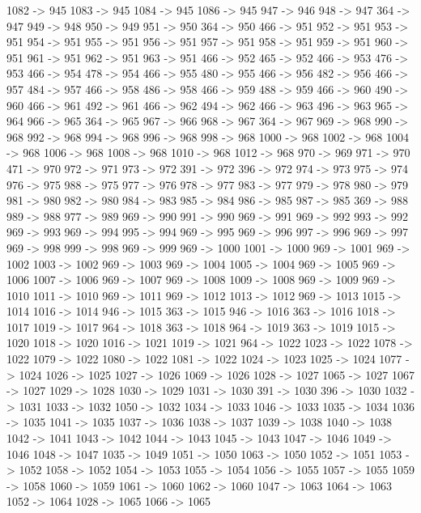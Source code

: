 {	1082 -> 945
	1083 -> 945
	1084 -> 945
	1086 -> 945
	947 -> 946
	948 -> 947
	364 -> 947
	949 -> 948
	950 -> 949
	951 -> 950
	364 -> 950
	466 -> 951
	952 -> 951
	953 -> 951
	954 -> 951
	955 -> 951
	956 -> 951
	957 -> 951
	958 -> 951
	959 -> 951
	960 -> 951
	961 -> 951
	962 -> 951
	963 -> 951
	466 -> 952
	465 -> 952
	466 -> 953
	476 -> 953
	466 -> 954
	478 -> 954
	466 -> 955
	480 -> 955
	466 -> 956
	482 -> 956
	466 -> 957
	484 -> 957
	466 -> 958
	486 -> 958
	466 -> 959
	488 -> 959
	466 -> 960
	490 -> 960
	466 -> 961
	492 -> 961
	466 -> 962
	494 -> 962
	466 -> 963
	496 -> 963
	965 -> 964
	966 -> 965
	364 -> 965
	967 -> 966
	968 -> 967
	364 -> 967
	969 -> 968
	990 -> 968
	992 -> 968
	994 -> 968
	996 -> 968
	998 -> 968
	1000 -> 968
	1002 -> 968
	1004 -> 968
	1006 -> 968
	1008 -> 968
	1010 -> 968
	1012 -> 968
	970 -> 969
	971 -> 970
	471 -> 970
	972 -> 971
	973 -> 972
	391 -> 972
	396 -> 972
	974 -> 973
	975 -> 974
	976 -> 975
	988 -> 975
	977 -> 976
	978 -> 977
	983 -> 977
	979 -> 978
	980 -> 979
	981 -> 980
	982 -> 980
	984 -> 983
	985 -> 984
	986 -> 985
	987 -> 985
	369 -> 988
	989 -> 988
	977 -> 989
	969 -> 990
	991 -> 990
	969 -> 991
	969 -> 992
	993 -> 992
	969 -> 993
	969 -> 994
	995 -> 994
	969 -> 995
	969 -> 996
	997 -> 996
	969 -> 997
	969 -> 998
	999 -> 998
	969 -> 999
	969 -> 1000
	1001 -> 1000
	969 -> 1001
	969 -> 1002
	1003 -> 1002
	969 -> 1003
	969 -> 1004
	1005 -> 1004
	969 -> 1005
	969 -> 1006
	1007 -> 1006
	969 -> 1007
	969 -> 1008
	1009 -> 1008
	969 -> 1009
	969 -> 1010
	1011 -> 1010
	969 -> 1011
	969 -> 1012
	1013 -> 1012
	969 -> 1013
	1015 -> 1014
	1016 -> 1014
	946 -> 1015
	363 -> 1015
	946 -> 1016
	363 -> 1016
	1018 -> 1017
	1019 -> 1017
	964 -> 1018
	363 -> 1018
	964 -> 1019
	363 -> 1019
	1015 -> 1020
	1018 -> 1020
	1016 -> 1021
	1019 -> 1021
	964 -> 1022
	1023 -> 1022
	1078 -> 1022
	1079 -> 1022
	1080 -> 1022
	1081 -> 1022
	1024 -> 1023
	1025 -> 1024
	1077 -> 1024
	1026 -> 1025
	1027 -> 1026
	1069 -> 1026
	1028 -> 1027
	1065 -> 1027
	1067 -> 1027
	1029 -> 1028
	1030 -> 1029
	1031 -> 1030
	391 -> 1030
	396 -> 1030
	1032 -> 1031
	1033 -> 1032
	1050 -> 1032
	1034 -> 1033
	1046 -> 1033
	1035 -> 1034
	1036 -> 1035
	1041 -> 1035
	1037 -> 1036
	1038 -> 1037
	1039 -> 1038
	1040 -> 1038
	1042 -> 1041
	1043 -> 1042
	1044 -> 1043
	1045 -> 1043
	1047 -> 1046
	1049 -> 1046
	1048 -> 1047
	1035 -> 1049
	1051 -> 1050
	1063 -> 1050
	1052 -> 1051
	1053 -> 1052
	1058 -> 1052
	1054 -> 1053
	1055 -> 1054
	1056 -> 1055
	1057 -> 1055
	1059 -> 1058
	1060 -> 1059
	1061 -> 1060
	1062 -> 1060
	1047 -> 1063
	1064 -> 1063
	1052 -> 1064
	1028 -> 1065
	1066 -> 1065
}
